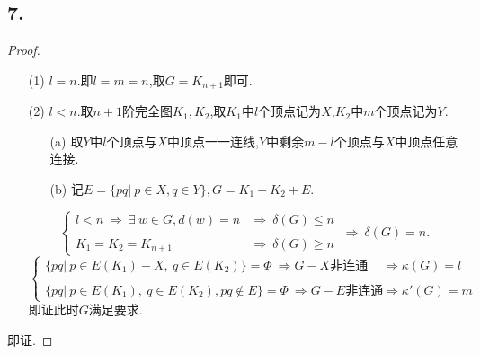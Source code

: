 \documentclass{article}
\begin{document}
\subsection*{7.}
\begin{proof}
    \begin{enumerate}
        \item []
        \item [(1)]$l=n$.即$l=m=n$,取$G=K_{n+1}$即可.
        \item [(2)]$l<n$.取$n+1$阶完全图$K_1,K_2$,取$K_1$中$l$个顶点记为$X$,$K_2$中$m$个顶点记为$Y$.
        \begin{enumerate}
            \item [(a)]取$Y$中$l$个顶点与$X$中顶点一一连线,$Y$中剩余$m-l$个顶点与$X$中顶点任意连接.
            \item [(b)]记$E=\{pq|\ p\in X,q\in Y\},G=K_1+K_2+E$.
        \end{enumerate}
        \[
            \begin{cases}
                l<n\ \Rightarrow \ \exists\ w\in G,d(w)=n &\Rightarrow\ \delta(G)\leq n\\
                \\
                K_1=K_2=K_{n+1}\ &\Rightarrow\ \delta(G)\geq n
            \end{cases}
            \ \Rightarrow\ 
            \delta(G)=n.
        \]
        \[
            \begin{cases}
                \{pq|\ p\in E(K_1)-X,\ q\in E(K_2)\}=\Phi\ \Rightarrow G-X\mbox{非连通}\ &\Rightarrow \kappa(G)=l\\
                \\
                \{pq|\ p\in E(K_1),\ q\in E(K_2),pq\notin E\}=\Phi\ \Rightarrow G-E\mbox{非连通}\ &\Rightarrow \kappa '(G)=m
            \end{cases}
        \]
        即证此时$G$满足要求.
    \end{enumerate}
    即证.
\end{proof}
\end{document}
